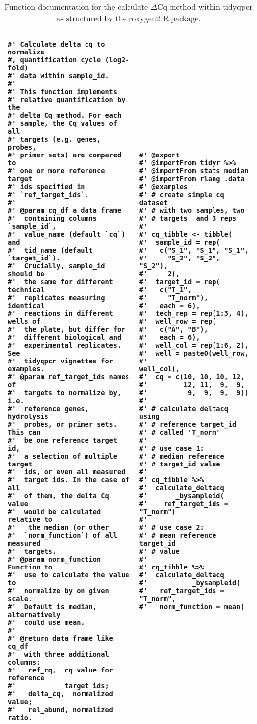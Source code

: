 \documentclass[../main.tex]{subfiles}
\begin{document}
\begin{table}
\centering
\begin{tabular}{| p{6.1cm}  p{5.6cm} |}
\hline
\begin{lstlisting}[style=mystyle]
#' Calculate delta cq to normalize 
#, quantification cycle (log2-fold)
#' data within sample_id.
#'
#' This function implements 
#' relative quantification by the 
#' delta Cq method. For each 
#' sample, the Cq values of all 
#' targets (e.g. genes, probes, 
#' primer sets) are compared to 
#' one or more reference target 
#' ids specified in 
#' `ref_target_ids`.
#'
#' @param cq_df a data frame 
#'  containing columns `sample_id`,
#'  value_name (default `cq`) and
#'  tid_name (default `target_id`).
#'  Crucially, sample_id should be
#'  the same for different technical
#'  replicates measuring identical 
#'  reactions in different wells of 
#'  the plate, but differ for 
#'  different biological and 
#'  experimental replicates. See 
#'  tidyqpcr vignettes for examples.
#' @param ref_target_ids names of 
#'  targets to normalize by, i.e. 
#'  reference genes, hydrolysis 
#'  probes, or primer sets. This can 
#'  be one reference target id,
#'  a selection of multiple target
#'  ids, or even all measured 
#'  target ids. In the case of all 
#'  of them, the delta Cq value 
#'  would be calculated relative to
#'   the median (or other 
#'  `norm_function`) of all measured 
#'  targets.
#' @param norm_function Function to 
#'  use to calculate the value to
#'  normalize by on given scale. 
#'  Default is median, alternatively 
#'  could use mean.
#'
#' @return data frame like cq_df 
#'  with three additional columns:
#'   ref_cq,  cq value for reference 
#'            target ids;
#'   delta_cq,  normalized value;
#'   rel_abund, normalized ratio.
\end{lstlisting} &
\begin{lstlisting}[firstnumber=52, style=mystyle]
#' @export
#' @importFrom tidyr %>%
#' @importFrom stats median
#' @importFrom rlang .data
#' @examples
#' # create simple cq dataset 
#' # with two samples, two 
#' # targets  and 3 reps
#'
#' cq_tibble <- tibble(
#'  sample_id = rep(
#'   c("S_1", "S_1", "S_1", 
#'     "S_2", "S_2", "S_2"),
#'     2),
#'  target_id = rep(
#'   c("T_1",
#'     "T_norm"),
#'   each = 6),
#'  tech_rep = rep(1:3, 4),
#'  well_row = rep(
#'   c("A", "B"),
#'   each = 6),
#'  well_col = rep(1:6, 2),
#'  well = paste0(well_row,
#'                well_col),
#'  cq = c(10, 10, 10, 12,
#'         12, 11,  9,  9, 
#'          9,  9,  9,  9))
#'                      
#' # calculate deltacq using
#' # reference target_id 
#' # called 'T_norm'
#' 
#' # use case 1: 
#' # median reference 
#' # target_id value
#'
#' cq_tibble %>%
#'  calculate_deltacq
#'       _bysampleid(
#'    ref_target_ids = "T_norm")
#' 
#' # use case 2: 
#' # mean reference target_id 
#' # value 
#'
#' cq_tibble %>%
#'  calculate_deltacq
#'           _bysampleid(
#'   ref_target_ids = "T_norm",
#'   norm_function = mean)
\end{lstlisting} \\
\hline
\end{tabular}
\caption{Function documentation for the calculate $\Delta$Cq method within tidyqpcr as structured by the roxygen2 R package.}
\label{function-documentation}
\end{table}
\end{document}
